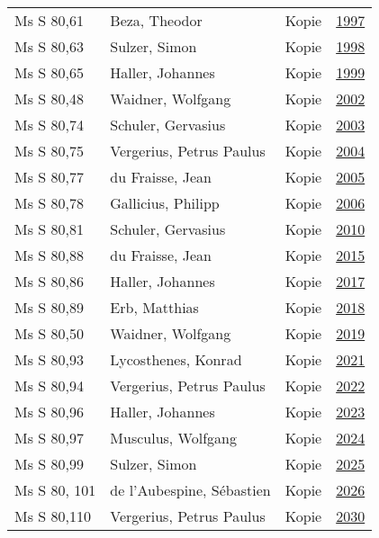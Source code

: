 \documentclass[10pt,a4paper,landscape]{report}
\begin{document}
\begin{longtable}{p{16cm}p{4cm}lr}
Ms S 80,61	&	Beza, Theodor	&	Kopie	&	\href{http://130.60.24.72/assignment/1997}{1997}\\
Ms S 80,63	&	Sulzer, Simon	&	Kopie	&	\href{http://130.60.24.72/assignment/1998}{1998}\\
Ms S 80,65	&	Haller, Johannes	&	Kopie	&	\href{http://130.60.24.72/assignment/1999}{1999}\\
Ms S 80,48	&	Waidner, Wolfgang	&	Kopie	&	\href{http://130.60.24.72/assignment/2002}{2002}\\
Ms S 80,74	&	Schuler, Gervasius	&	Kopie	&	\href{http://130.60.24.72/assignment/2003}{2003}\\
Ms S 80,75	&	Vergerius, Petrus Paulus	&	Kopie	&	\href{http://130.60.24.72/assignment/2004}{2004}\\
Ms S 80,77	&	du Fraisse, Jean	&	Kopie	&	\href{http://130.60.24.72/assignment/2005}{2005}\\
Ms S 80,78	&	Gallicius, Philipp	&	Kopie	&	\href{http://130.60.24.72/assignment/2006}{2006}\\
Ms S 80,81	&	Schuler, Gervasius	&	Kopie	&	\href{http://130.60.24.72/assignment/2010}{2010}\\
Ms S 80,88	&	du Fraisse, Jean	&	Kopie	&	\href{http://130.60.24.72/assignment/2015}{2015}\\
Ms S 80,86	&	Haller, Johannes	&	Kopie	&	\href{http://130.60.24.72/assignment/2017}{2017}\\
Ms S 80,89	&	Erb, Matthias	&	Kopie	&	\href{http://130.60.24.72/assignment/2018}{2018}\\
Ms S 80,50	&	Waidner, Wolfgang	&	Kopie	&	\href{http://130.60.24.72/assignment/2019}{2019}\\
Ms S 80,93	&	Lycosthenes, Konrad	&	Kopie	&	\href{http://130.60.24.72/assignment/2021}{2021}\\
Ms S 80,94	&	Vergerius, Petrus Paulus	&	Kopie	&	\href{http://130.60.24.72/assignment/2022}{2022}\\
Ms S 80,96	&	Haller, Johannes	&	Kopie	&	\href{http://130.60.24.72/assignment/2023}{2023}\\
Ms S 80,97	&	Musculus, Wolfgang	&	Kopie	&	\href{http://130.60.24.72/assignment/2024}{2024}\\
Ms S 80,99	&	Sulzer, Simon	&	Kopie	&	\href{http://130.60.24.72/assignment/2025}{2025}\\
Ms S 80, 101	&	de l'Aubespine, Sébastien	&	Kopie	&	\href{http://130.60.24.72/assignment/2026}{2026}\\
Ms S 80,110	&	Vergerius, Petrus Paulus	&	Kopie	&	\href{http://130.60.24.72/assignment/2030}{2030}\\

\end{longtable}
\end{document}

